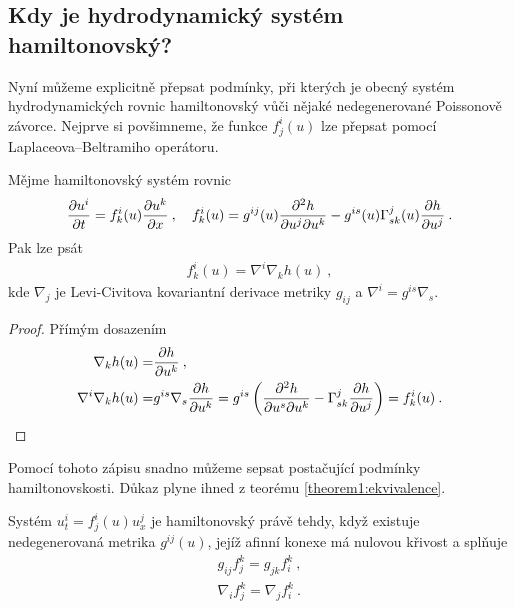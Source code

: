 \subsection{Kdy je hydrodynamický systém hamiltonovský?}

Nyní můžeme explicitně přepsat podmínky, při kterých je obecný systém hydrodynamických rovnic hamiltonovský vůči nějaké nedegenerované Poissonově závorce. Nejprve si povšimneme, že funkce $f^i_j(u)$ lze přepsat pomocí Laplaceova–Beltramiho operátoru.

\begin{proposition}
    Mějme hamiltonovský systém rovnic
    \begin{align}
        \frac{\partial u^i}{\partial t} = f^i_k(u) \frac{\partial u^k}{\partial x} \:, \quad f^i_k(u) = g^{ij}(u) \frac{\partial^2 h}{\partial u^j \partial u^k} - g^{is}(u) \Gamma^j_{sk}(u) \frac{\partial h}{\partial u^j} \:. \label{eq:hamiltonovsky-system}
    \end{align}
    Pak lze psát 
    \begin{align}
        f^i_k(u) = \nabla^i \nabla_k h(u) \:, 
    \end{align}
    kde $\nabla_j$ je Levi-Civitova kovariantní derivace metriky $g_{ij}$ a $\nabla^i = g^{is} \nabla_s$. 
\end{proposition}
\begin{proof}
    Přímým dosazením
    \begin{align}
        \nabla_k h(u) =& \frac{\partial h}{\partial u^k} \:, \\
        \nabla^i \nabla_k h(u) =& g^{is} \nabla_s \frac{\partial h}{\partial u^k} = g^{is} \left( \frac{\partial^2 h}{\partial u^s \partial u^k} - \Gamma^j_{sk} \frac{\partial h}{\partial u^j} \right) = f^i_k(u) \:.
    \end{align}
\end{proof}

Pomocí tohoto zápisu snadno můžeme sepsat postačující podmínky hamiltonovskosti.
Důkaz plyne ihned z teorému \vref{theorem1:ekvivalence}.

\begin{theorem}
    Systém $u^i_t = f^i_j(u) u^j_x$ je hamiltonovský právě tehdy, když existuje nedegenerovaná metrika $g^{ij}(u)$, jejíž afinní konexe má nulovou křivost a splňuje
    \begin{align}
        g_{ij} f^k_j = g_{jk} f^k_i \:, \label{eq:gf=gf} \\
        \nabla_i f^k_j = \nabla_j f^k_i \label{eq:nablaf} \:.
    \end{align}
\end{theorem}


